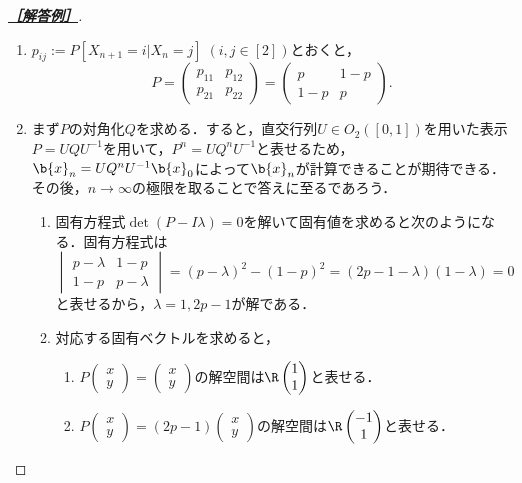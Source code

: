 \documentclass[uplatex,dvipdfmx]{jsarticle}
\begin{document}
\begin{proof}[\textbf{\underline{［解答例］}}]\mbox{}
    \begin{enumerate}
        \item $p_{ij}:=P[X_{n+1}=i|X_n=j]\;(i,j\in[2])$とおくと，
        \[P=\begin{pmatrix}p_{11}&p_{12}\\p_{21}&p_{22}\end{pmatrix}=\begin{pmatrix}p&1-p\\1-p&p\end{pmatrix}.\]
        \item まず$P$の対角化$Q$を求める．すると，直交行列$U\in O_2([0,1])$を用いた表示$P=UQU^{-1}$を用いて，$P^n=UQ^nU^{-1}$と表せるため，
        $\b{x}_n=UQ^nU^{-1}\b{x}_0$によって$\b{x}_n$が計算できることが期待できる．
        その後，$n\to\infty$の極限を取ることで答えに至るであろう．
        \begin{enumerate}
            \item 固有方程式$\det(P-I\lambda)=0$を解いて固有値を求めると次のようになる．固有方程式は
            \[\begin{vmatrix}p-\lambda&1-p\\1-p&p-\lambda\end{vmatrix}=(p-\lambda)^2-(1-p)^2=(2p-1-\lambda)(1-\lambda)=0\]
            と表せるから，$\lambda=1,2p-1$が解である．
            \item 対応する固有ベクトルを求めると，
            \begin{enumerate}
                \item $P\begin{pmatrix}x\\y\end{pmatrix}=\begin{pmatrix}x\\y\end{pmatrix}$の解空間は$\R \begin{pmatrix}1\\1\end{pmatrix}$と表せる．
                \item $P\begin{pmatrix}x\\y\end{pmatrix}=(2p-1)\begin{pmatrix}x\\y\end{pmatrix}$の解空間は$\R \begin{pmatrix}-1\\1\end{pmatrix}$と表せる．

\end{enumerate}
\end{enumerate}
\end{enumerate}
\end{proof}
\end{document}
